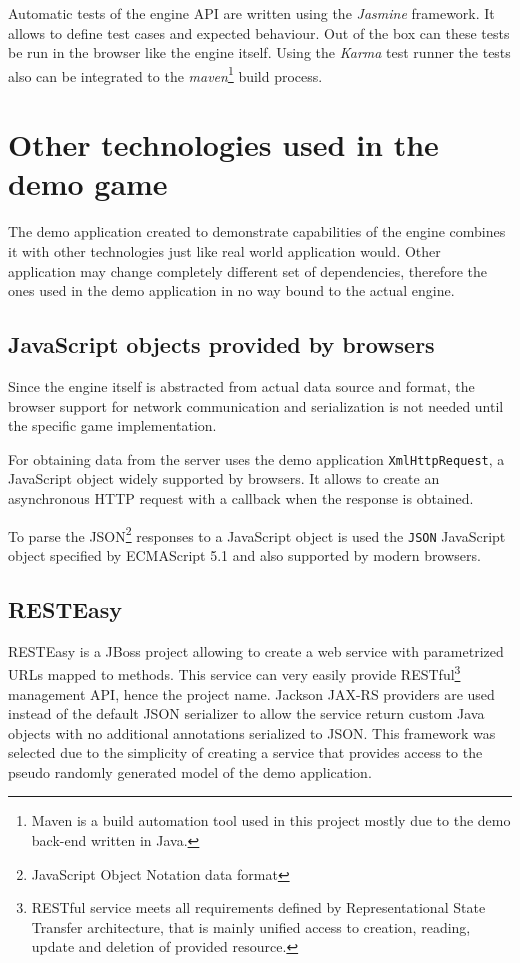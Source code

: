 \documentclass[11pt,oneside, final]{fithesis2}
\begin{document}
Automatic tests of the engine API are written using the \emph{Jasmine} framework. It allows to define test cases and expected behaviour\cite{jasmine}. Out of the box can these tests be run in the browser like the engine itself. Using the \emph{Karma} test runner the tests also can be integrated to the \emph{maven}\footnote{Maven is a build automation tool\cite{maven} used in this project mostly due to the demo back-end written in Java.} build process\cite{karma}.

\section{Other technologies used in the demo game}
The demo application created to demonstrate capabilities of the engine combines it with other technologies just like real world application would. Other application may change completely different set of dependencies, therefore the ones used in the demo application in no way bound to the actual engine.

\subsection{JavaScript objects provided by browsers}
Since the engine itself is abstracted from actual data source and format, the browser support for network communication and serialization is not needed until the specific game implementation.

For obtaining data from the server uses the demo application \texttt{XmlHttpRequest}, a JavaScript object widely supported by browsers\cite{xhr}. It allows to create an asynchronous HTTP request with a callback when the response is obtained.

To parse the JSON\footnote{JavaScript Object Notation data format} responses to a JavaScript object is used the \texttt{JSON} JavaScript object specified by ECMAScript 5.1 and also supported by modern browsers\cite{json}.

\subsection{RESTEasy}
RESTEasy is a JBoss project allowing to create a web service with parametrized URLs mapped to methods\cite{resteasy}. This service can very easily  provide RESTful\footnote{RESTful service meets all requirements defined by Representational State Transfer architecture, that is mainly unified access to creation, reading, update and deletion of provided resource\cite{fielding}.} management API, hence the project name. Jackson JAX-RS providers\cite{jackson} are used instead of the default JSON serializer to allow the service return custom Java objects with no additional annotations serialized to JSON. This framework was selected due to the simplicity of creating a service that provides access to the pseudo randomly generated model of the demo application.
\end{document}
